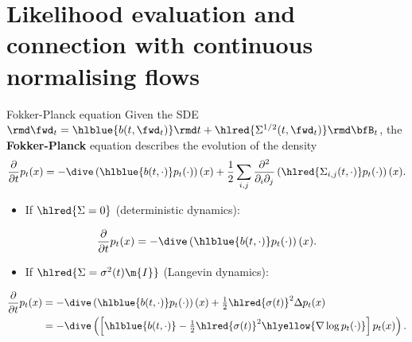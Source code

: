 

\section{Likelihood evaluation and connection with continuous normalising flows}

\begin{frame}{Fokker-Planck equation}
%
%
Given the SDE $\rmd \fwd_t = \hlblue{b(t, \fwd_t)} \rmd t + \hlred{\Sigma^{1/2}(t, \fwd_t)} \rmd \bfB_t$, the
\textbf{Fokker-Planck} equation describes the evolution of the density
\begin{equation}
\label{eq:fokker_planck}
\frac{\partial}{\partial t} p_t(x) = -\dive\left( \hlblue{b(t, \cdot)} p_t(\cdot) \right)(x) + \frac{1}{2} \sum_{i,j} \frac{\partial^2}{\partial_i\partial_j} \left( \hlred{\Sigma_{i,j}(t, \cdot)} p_t(\cdot) \right)(x).
\end{equation}
\pause
\vspace{-\topsep}
\begin{itemize}
    [triangle]
    \item If $\hlred{\Sigma = 0}$ (deterministic dynamics): 
\end{itemize}
\begin{equation*}
    \frac{\partial}{\partial t} p_t(x) = -\dive\left( \hlblue{b(t, \cdot)} p_t(\cdot)  \right) (x).
\end{equation*}
\pause
\vspace{-\topsep}
\begin{itemize} [triangle]
    \item If $\hlred{\Sigma = \sigma^2(t) \m{I}}$ (Langevin dynamics):
\end{itemize}
\vspace{-0.5em}
\begin{align*}
\label{eq:fokker_planck_isotropic}
\frac{\partial}{\partial t} p_t(x) 
&= -\dive\left( \hlblue{b(t, \cdot)} p_t(\cdot)  \right)(x)  + \tfrac{1}{2} \hlred{\sigma(t)}^2 \Delta p_t (x) \\
&= -\dive\left( \left[ \hlblue{b(t, \cdot)} - \tfrac{1}{2} \hlred{\sigma(t)}^2 \hlyellow{\nabla \log p_t(\cdot)} \right] p_t(x)  \right).
\end{align*}
%
\end{frame}

